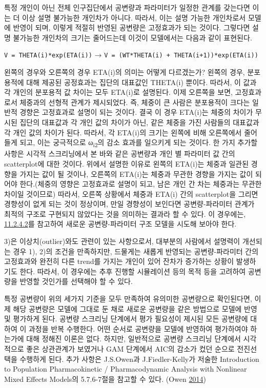 \documentclass[
  10pt,
  krantz2,
  a4paper]{krantz}
\theoremstyle{definition}
\theoremstyle{definition}
\theoremstyle{definition}
\theoremstyle{remark}
\begin{document}
특정 개인이 아닌 전체 인구집단에서 공변량과 파라미터가 일정한 관계를 갖는다면 이는 더 이상 설명 불가능한 개인차가 아니다. 따라서, 이는 설명 가능한 개인차로서 모델에 반영이 되며, 이렇게 적절히 반영된 공변량은 고정효과가 되는 것이다. 그렇다면 설명 불가능한 개인차의 크기는 줄어드는데 이것이 모델에서는 다음과 같이 표현된다.

\texttt{V\ =\ THETA(i)*exp(ETA(i))} → \texttt{V\ =\ (WT*THETA(i)\ +\ THETA(i+1))*exp(ETA(i))}

왼쪽의 경우와 오른쪽의 경우 ETA(i)의 의미는 어떻게 다르겠는가? 왼쪽의 경우, 분포용적에 대해 제공된 공정효과는 집단의 대표값인 THETA(i) 뿐이다. 따라서, 이 값과 각 개인의 분포용적 값 차이는 모두 ETA(i)로 설명된다. 이제 오른쪽을 보면, 고정효과로서 체중과의 선형적 관계가 제시되었다. 즉, 체중이 큰 사람은 분포용적이 크다는 일반적 경향은 고정효과로 설명이 되는 것이다. 결국 이 경우 ETA(i)는 체중의 차이가 무시된 집단의 대표값과 각 개인 값의 차이가 아닌, 같은 체중을 가진 사람들의 대표값과 각 개인 값의 차이가 된다. 따라서, 각 ETA(i)의 크기는 왼쪽에 비해 오른쪽에서 줄어들게 되고, 이는 궁극적으로 ω\textsubscript{i2}의 감소 효과를 일으키게 되는 것이다. 한 가지 추가할 사항은 시각적 스크리닝에서 본 바와 같은 공변량과 개인 별 파라미터 값 간의 scatterplot에 대한 것이다. 위에서 설명한 이유로 왼쪽의 ETA(i)는 체중과 일관된 경향을 가지는 값이 될 것이나, 오른쪽의 ETA(i)는 체중과 무관한 경향을 가지는 값이 되어야 한다.(체중의 영향은 고정효과로 설명이 되고, 남은 개인 간 차는 체중과는 무관한 차이일 것이므로) 따라서, 오른쪽 상황에서 체중과 ETA(i) 간의 scatterplot을 그리면 경향성이 없게 되는 것이 정상이며, 만일 경향성이 보인다면 공변량-파라미터 관계가 최적의 구조로 구현되지 않았다는 것을 의미하는 결과라 할 수 있다. 이 경우에는, \protect\hyperlink{cov-param}{11.2.4.2}를 참고하여 새로운 공변량-파라미터 구조 모델을 시도해 보아야 한다.

3)은 이상치(outlier)와도 관련이 있는 사항으로서, 대부분의 사람에서 설명력이 개선되는 경우 1), 2)의 조건을 만족하지만, 드물게는 새롭게 반영되는 공변량-파라미터 간의 고정효과와 완전히 다른 trend를 가지는 개인이 있어 잔차가 증가하는 상황이 발생하기도 한다. 따라서, 이 경우에는 추후 진행할 시뮬레이션 등의 목적 등을 고려하여 공변량을 반영할 것인가를 선택해야 할 수 있다.

특정 공변량이 위의 세가지 기준을 모두 만족하여 유의미한 공변량으로 확인된다면, 이제 해당 공변량은 모델에 그대로 둔 채로 새로운 공변량을 같은 방법으로 모델에 반영 및 평가하게 된다. 공변량 스크리닝 단계에서 평가 필요성이 제시된 모든 공변량에 대하여 이 과정을 반복 수행한다. 어떤 순서로 공변량을 모델에 반영하여 평가하여야 하는가에 대해 정해진 이론은 없다. 하지만, 일반적으로 공변량 스크리닝 단계에서 시각적으로 좋은 상관관계가 보였거나 GAM 단계에서 AIC의 감소가 컸던 순으로 전진선택을 수행하게 된다. 추가 사항은 J.S.Owen과 J.Fiedler-Kelly가 저술한 Introduction to Population Pharmacokinetic / Pharmacodynamic Analysis with Nonlinear Mixed Effects Models의 5.7.6-7절을 참고할 수 있다. (Owen \protect\hyperlink{ref-kelly}{2014})
\end{document}
